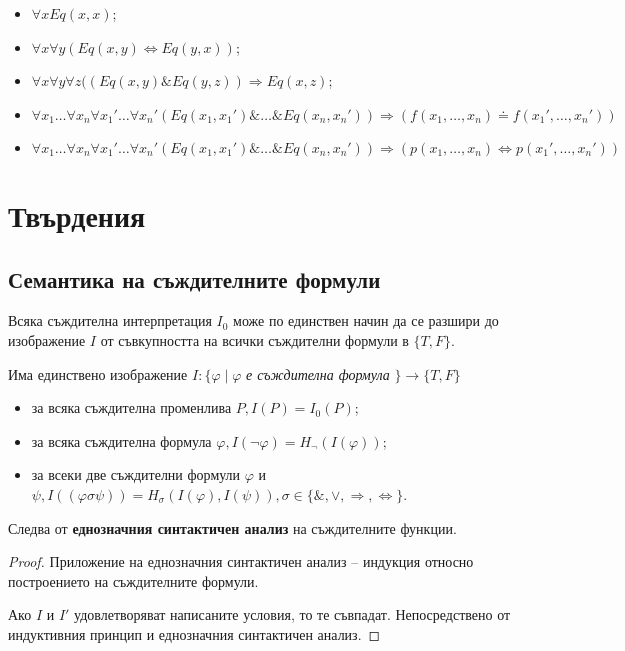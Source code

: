 \documentclass{article}
\def\Proofs{1}
\def\Claims{1}
\begin{document}
\begin{prop}
$\ $
\begin{itemize}
\item $\forall x Eq(x,x)$;
\item $\forall x\forall y (Eq(x, y) \Leftrightarrow Eq(y, x))$;
\item $\forall x\forall y\forall z((Eq(x, y) \& Eq(y,z)) \Rightarrow Eq(x, z)$;
\item $\forall x_1\ldots\forall x_n\forall x_1'\ldots\forall x_n' (Eq(x_1, x_1')\&\ldots\& Eq(x_n, x_n')) \Rightarrow (f(x_1, \ldots, x_n) \doteq f(x_1', \ldots, x_n'))$
\item $\forall x_1\ldots\forall x_n\forall x_1'\ldots\forall x_n' (Eq(x_1, x_1')\&\ldots\& Eq(x_n, x_n')) \Rightarrow (p(x_1, \ldots, x_n) \Leftrightarrow p(x_1', \ldots, x_n'))$
\end{itemize}

\end{prop}

\newpage
\fi

\ifcase\Claims\or

\section*{Твърдения}

\subsection*{Семантика на съждителните формули}

\begin{claim} \label{tv-1}
Всяка съждителна интерпретация $I_0$ може по единствен начин да се разшири до изображение $I$ от съвкупността на всички съждителни формули в $\{T, F\}$.

Има единствено изображение $I : \{\varphi \mid \varphi$ \textit{е съждителна формула} $\} \rightarrow \{T, F\}$ 
\begin{itemize}
\item за всяка съждителна променлива $P, I(P) = I_0(P)$;
\item за всяка съждителна формула $\varphi, I(\neg\varphi) = H_{\neg}(I(\varphi))$;
\item за всеки две съждителни формули $\varphi$ и $\psi, I((\varphi \sigma \psi)) = H_{\sigma}(I(\varphi), I(\psi)), \sigma \in \{ \&, \lor, \Rightarrow, \Leftrightarrow \}$.
\end{itemize}

Следва от \textbf{еднозначния синтактичен анализ} на съждителните функции.


\ifcase\Proofs\or
\begin{proof}
Приложение на еднозначния синтактичен анализ -- индукция относно построението на съждителните формули.

Ако $I$ и $I'$ удовлетворяват написаните условия, то те съвпадат. Непосредствено от индуктивния принцип и еднозначния синтактичен анализ.

\end{proof}
\fi
\end{claim}
\end{document}
